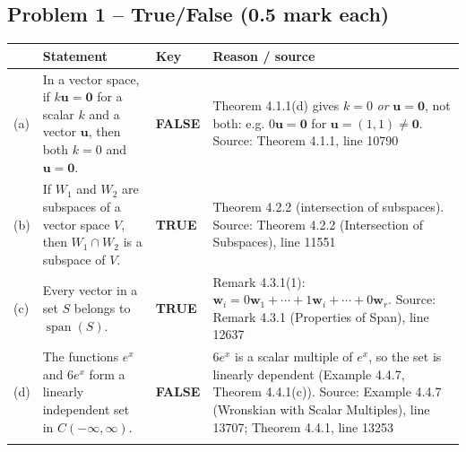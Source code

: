 \documentclass[11pt,a4paper]{article}
\newcommand{\Src}[1]{{\footnotesize\color{black!65}Source: #1}}
\begin{document}
\subsection*{Problem 1 -- True/False (0.5 mark each)}
\begin{tabularx}{\linewidth}{@{}l >{\raggedright\arraybackslash}X l >{\raggedright\arraybackslash}X@{}}\toprule & Statement & Key & Reason / source\\\midrule
(a) & In a vector space, if $k\mathbf{u}=\mathbf{0}$ for a scalar $k$ and a vector $\mathbf{u}$, then both $k=0$ and $\mathbf{u}=\mathbf{0}$. & \textbf{FALSE} & Theorem 4.1.1(d) gives $k=0$ \emph{or} $\mathbf{u}=\mathbf{0}$, not both: e.g. $0\mathbf{u}=\mathbf{0}$ for $\mathbf{u}=(1,1)\neq\mathbf{0}$. \Src{Theorem 4.1.1, line 10790}\\\addlinespace
(b) & If $W_1$ and $W_2$ are subspaces of a vector space $V$, then $W_1\cap W_2$ is a subspace of $V$. & \textbf{TRUE} & Theorem 4.2.2 (intersection of subspaces). \Src{Theorem 4.2.2 (Intersection of Subspaces), line 11551}\\\addlinespace
(c) & Every vector in a set $S$ belongs to $\operatorname{span}(S)$. & \textbf{TRUE} & Remark 4.3.1(1): $\mathbf{w}_i=0\mathbf{w}_1+\cdots+1\mathbf{w}_i+\cdots+0\mathbf{w}_r$. \Src{Remark 4.3.1 (Properties of Span), line 12637}\\\addlinespace
(d) & The functions $e^{x}$ and $6e^{x}$ form a linearly independent set in $C(-\infty,\infty)$. & \textbf{FALSE} & $6e^x$ is a scalar multiple of $e^x$, so the set is linearly dependent (Example 4.4.7, Theorem 4.4.1(c)). \Src{Example 4.4.7 (Wronskian with Scalar Multiples), line 13707; Theorem 4.4.1, line 13253}\\\addlinespace
\bottomrule\end{tabularx}
\end{document}
